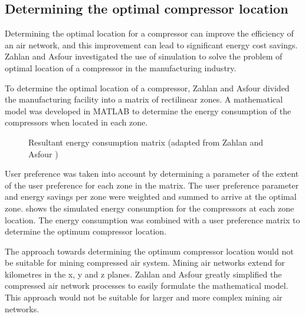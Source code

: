 \subsection{Determining the optimal compressor location}
Determining the optimal location for a compressor can improve the efficiency of an air network, and this improvement can lead to significant energy cost savings. Zahlan and Asfour \cite{zahlan2015multi} investigated the use of simulation to solve the problem of optimal location of a compressor in the manufacturing industry.
\par 
To determine the optimal location of a compressor, Zahlan and Asfour divided the manufacturing facility into a matrix of rectilinear zones. A mathematical model was developed in MATLAB to determine the energy consumption of the compressors when located in each zone.
\par
\begin{figure}[!htbp]
	\centering
	\caption[Simulated energy consumption matrix]{Resultant energy consumption matrix (adapted from Zahlan and Asfour \cite{zahlan2015multi})}
	\label{fig: EnergyconsumptionMatrix}
\end{figure} 
User preference was taken into account by determining a parameter of the extent of the user preference for each zone in the matrix. The user preference parameter and energy savings per zone were weighted and summed to arrive at the optimal zone.  shows the simulated energy consumption for the compressors at each zone location. The energy consumption was combined with a user preference matrix to determine the optimum compressor location.
\par
The approach towards determining the optimum compressor location would not be suitable for mining compressed air system. Mining air networks extend for kilometres in the x, y and z planes. Zahlan and Asfour greatly simplified the compressed air network processes to easily formulate the mathematical model. This approach would not be suitable for larger and more complex mining air networks.

